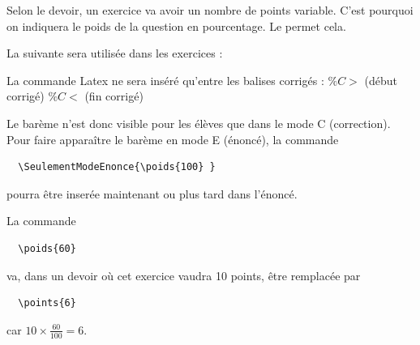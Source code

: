 \begin{dsxl}
 Selon le devoir, un exercice va avoir un nombre de points variable. C'est pourquoi on indiquera le poids de la question en pourcentage. 
Le  permet cela. 
\end{dsxl}

La  suivante sera utilisée dans les exercices : 
\begin{dsxl}
 La commande Latex   ne sera inséré qu'entre les balises corrigés :  $\%C>$ (début corrigé)  $\%C<$ (fin corrigé)
\end{dsxl}

Le barème n'est donc visible pour les élèves que dans le mode C (correction). Pour faire apparaître le barème en mode E (énoncé), la commande 
\begin{verbatim}
  \SeulementModeEnonce{\poids{100} }
\end{verbatim}
pourra être inserée maintenant ou plus tard dans l'énoncé.

\begin{dsxl}
 La commande 
 \begin{verbatim}
  \poids{60}
 \end{verbatim}
va, dans un devoir où cet exercice vaudra 10 points, être remplacée par 
 \begin{verbatim}
  \points{6}
 \end{verbatim}
 car $10\times \frac{60}{100} = 6$. 
\end{dsxl}

